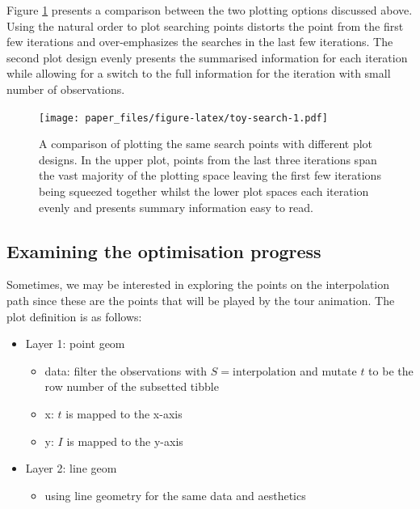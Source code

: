 \documentclass[12pt]{article}
\providecommand{\tightlist}{%
  \setlength{\itemsep}{0pt}\setlength{\parskip}{0pt}}
\begin{document}
Figure \ref{toy-search} presents a comparison between the two plotting options discussed above. Using the natural order to plot searching points distorts the point from the first few iterations and over-emphasizes the searches in the last few iterations. The second plot design evenly presents the summarised information for each iteration while allowing for a switch to the full information for the iteration with small number of observations.

\begin{figure}
\centering
\texttt{[image: paper\_files/figure-latex/toy-search-1.pdf]}
\caption{\label{fig:toy-search}\label{toy-search}A comparison of plotting the same search points with different plot designs. In the upper plot, points from the last three iterations span the vast majority of the plotting space leaving the first few iterations being squeezed together whilst the lower plot spaces each iteration evenly and presents summary information easy to read.}
\end{figure}

\hypertarget{examining-the-optimisation-progress}{%
\subsection{Examining the optimisation progress}\label{examining-the-optimisation-progress}}

Sometimes, we may be interested in exploring the points on the interpolation path since these are the points that will be played by the tour animation. The plot definition is as follows:

\begin{itemize}
\tightlist
\item
  Layer 1: point geom

  \begin{itemize}
  \tightlist
  \item
    data: filter the observations with \(S = \text{interpolation}\) and mutate \(t\) to be the row number of the subsetted tibble
  \item
    x: \(t\) is mapped to the x-axis
  \item
    y: \(I\) is mapped to the y-axis
  \end{itemize}
\item
  Layer 2: line geom

  \begin{itemize}
  \tightlist
  \item
    using line geometry for the same data and aesthetics
  \end{itemize}
\end{itemize}
\end{document}
